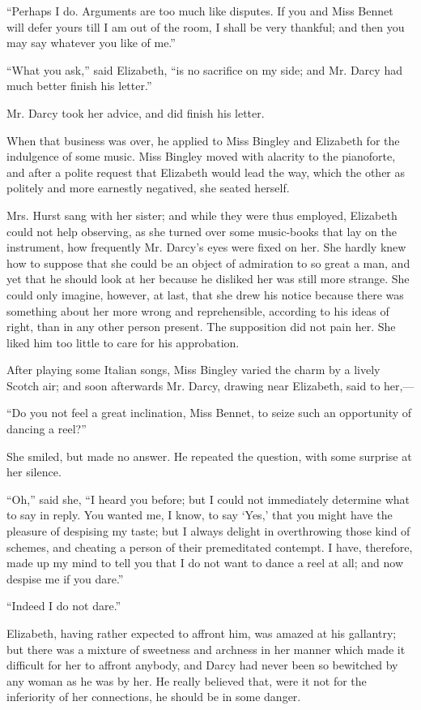 \documentclass[12pt]{book}
\begin{document}
``Perhaps I do. Arguments are too much like disputes. If you and Miss Bennet will defer yours till I am out of the room, I shall be very thankful; and then you may say whatever you like of me.''

``What you ask,'' said Elizabeth, ``is no sacrifice on my side; and Mr. Darcy had much better finish his letter.''

Mr. Darcy took her advice, and did finish his letter.

When that business was over, he applied to Miss Bingley and Elizabeth for the indulgence of some music. Miss Bingley moved with alacrity to the pianoforte, and after a polite request that Elizabeth would lead the way, which the other as politely and more earnestly negatived, she seated herself.

Mrs. Hurst sang with her sister; and while they were thus employed, Elizabeth could not help observing, as she turned over some music-books that lay on the instrument, how frequently Mr. Darcy's eyes were fixed on her. She hardly knew how to suppose that she could be an object of admiration to so great a man, and yet that he should look at her because he disliked her was still more strange. She could only imagine, however, at last, that she drew his notice because there was something about her more wrong and reprehensible, according to his ideas of right, than in any other person present. The supposition did not pain her. She liked him too little to care for his approbation.

After playing some Italian songs, Miss Bingley varied the charm by a lively Scotch air; and soon afterwards Mr. Darcy, drawing near Elizabeth, said to her,---

``Do you not feel a great inclination, Miss Bennet, to seize such an opportunity of dancing a reel?''

She smiled, but made no answer. He repeated the question, with some surprise at her silence.

``Oh,'' said she, ``I heard you before; but I could not immediately determine what to say in reply. You wanted me, I know, to say `Yes,' that you might have the pleasure of despising my taste; but I always delight in overthrowing those kind of schemes, and cheating a person of their premeditated contempt. I have, therefore, made up my mind to tell you that I do not want to dance a reel at all; and now despise me if you dare.''

``Indeed I do not dare.''

Elizabeth, having rather expected to affront him, was amazed at his gallantry; but there was a mixture of sweetness and archness in her manner which made it difficult for her to affront anybody, and Darcy had never been so bewitched by any woman as he was by her. He really believed that, were it not for the inferiority of her connections, he should be in some danger.
\end{document}
